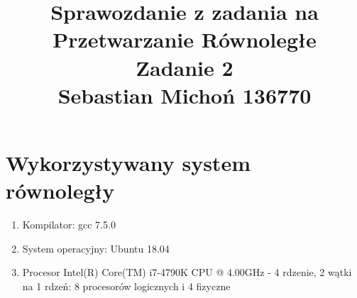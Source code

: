 \documentclass[12pt]{article}
\begin{document}
\title{Sprawozdanie z zadania na Przetwarzanie Równoległe\\
\large Zadanie 2\\
\large Sebastian Michoń 136770}
\date{\vspace{-10ex}}
\maketitle

\section{Wykorzystywany system równoległy}
\begin {enumerate}
	\item Kompilator: gcc 7.5.0
	\item System operacyjny: Ubuntu 18.04
	\item Procesor Intel(R) Core(TM) i7-4790K CPU @ 4.00GHz - 4 rdzenie, 2 wątki na 1 rdzeń: 8 procesorów logicznych i 4 fizyczne
\end {enumerate}
\end{document}
